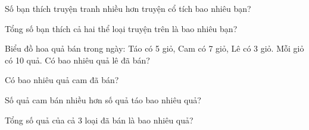 \begin{ex}
Số bạn thích truyện tranh nhiều hơn truyện cổ tích bao nhiêu bạn?
\end{ex}

\begin{ex}
Tổng số bạn thích cả hai thể loại truyện trên là bao nhiêu bạn?
\end{ex}

\begin{ex}
Biểu đồ hoa quả bán trong ngày: Táo có 5 giỏ, Cam có 7 giỏ, Lê có 3 giỏ. Mỗi giỏ có 10 quả. Có bao nhiêu quả lê đã bán?
\end{ex}

\begin{ex}
Có bao nhiêu quả cam đã bán?
\end{ex}

\begin{ex}
Số quả cam bán nhiều hơn số quả táo bao nhiêu quả?
\end{ex}

\begin{ex}
Tổng số quả của cả 3 loại đã bán là bao nhiêu quả?
\end{ex}
